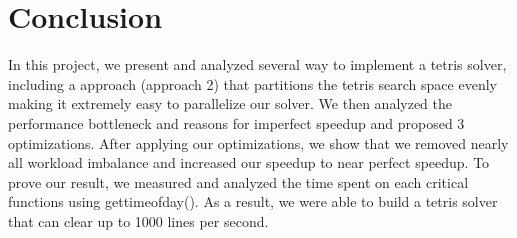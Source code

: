 \section{Conclusion}
In this project, we present and analyzed several way to implement a tetris solver, including a approach (approach 2) that partitions the tetris search space evenly making it extremely easy to parallelize our solver. We then analyzed the performance bottleneck and reasons for imperfect speedup and proposed 3 optimizations. After applying our optimizations, we show that we removed nearly all workload imbalance and increased our speedup to near perfect speedup. To prove our result, we measured and analyzed the time spent on each critical functions using gettimeofday(). 
As a result, we were able to build a tetris solver that can clear up to 1000 lines per second.